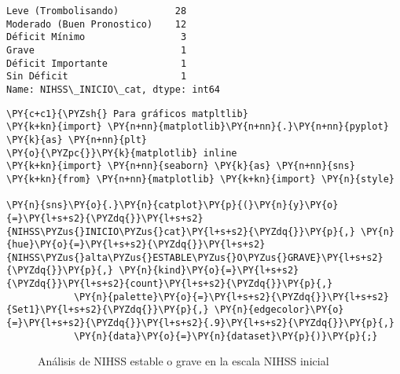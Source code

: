 
            \begin{tcolorbox}[breakable, size=fbox, boxrule=.5pt, pad at break*=1mm, opacityfill=0]
\begin{Verbatim}[commandchars=\\\{\}]
Leve (Trombolisando)          28
Moderado (Buen Pronostico)    12
Déficit Mínimo                 3
Grave                          1
Déficit Importante             1
Sin Déficit                    1
Name: NIHSS\_INICIO\_cat, dtype: int64
\end{Verbatim}
\end{tcolorbox}
        
    \begin{tcolorbox}[breakable, size=fbox, boxrule=1pt, pad at break*=1mm,colback=cellbackground, colframe=cellborder]
\begin{Verbatim}[commandchars=\\\{\}]
\PY{c+c1}{\PYZsh{} Para gráficos matpltlib}
\PY{k+kn}{import} \PY{n+nn}{matplotlib}\PY{n+nn}{.}\PY{n+nn}{pyplot} \PY{k}{as} \PY{n+nn}{plt}
\PY{o}{\PYZpc{}}\PY{k}{matplotlib} inline
\PY{k+kn}{import} \PY{n+nn}{seaborn} \PY{k}{as} \PY{n+nn}{sns}
\PY{k+kn}{from} \PY{n+nn}{matplotlib} \PY{k+kn}{import} \PY{n}{style}

\PY{n}{sns}\PY{o}{.}\PY{n}{catplot}\PY{p}{(}\PY{n}{y}\PY{o}{=}\PY{l+s+s2}{\PYZdq{}}\PY{l+s+s2}{NIHSS\PYZus{}INICIO\PYZus{}cat}\PY{l+s+s2}{\PYZdq{}}\PY{p}{,} \PY{n}{hue}\PY{o}{=}\PY{l+s+s2}{\PYZdq{}}\PY{l+s+s2}{NIHSS\PYZus{}alta\PYZus{}ESTABLE\PYZus{}O\PYZus{}GRAVE}\PY{l+s+s2}{\PYZdq{}}\PY{p}{,} \PY{n}{kind}\PY{o}{=}\PY{l+s+s2}{\PYZdq{}}\PY{l+s+s2}{count}\PY{l+s+s2}{\PYZdq{}}\PY{p}{,}
            \PY{n}{palette}\PY{o}{=}\PY{l+s+s2}{\PYZdq{}}\PY{l+s+s2}{Set1}\PY{l+s+s2}{\PYZdq{}}\PY{p}{,} \PY{n}{edgecolor}\PY{o}{=}\PY{l+s+s2}{\PYZdq{}}\PY{l+s+s2}{.9}\PY{l+s+s2}{\PYZdq{}}\PY{p}{,}
            \PY{n}{data}\PY{o}{=}\PY{n}{dataset}\PY{p}{)}\PY{p}{;}
\end{Verbatim}
\end{tcolorbox}

\begin{center}
    	\begin{figure}[H]
	\centering
	\caption{Análisis de NIHSS estable o grave en la escala NIHSS inicial}
	\label{fig:aNISSNISS}
	\end{figure}
\end{center}
    
